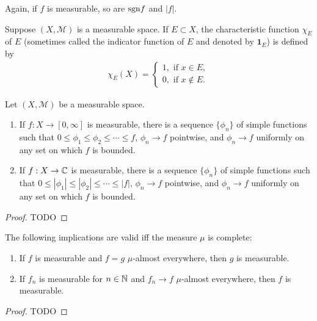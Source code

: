 Again, if $f$ is measurable, so are $\mathrm{sgn} f$ and $|f|$.

\begin{definition}
    Suppose $(X, \mathcal{M})$ is a measurable space.
    If $E \subset X$, the characteristic function $\chi_E$ of $E$ (sometimes called the indicator function of $E$ and denoted by $\mathbf{1}_E$) is defined by
    \begin{align}
        \chi_E(X) = \begin{cases}
            1, \text{ if } x \in E, \\
            0, \text{ if } x \notin E.
        \end{cases}
    \end{align}
\end{definition}

\begin{theorem}
    Let $(X, \mathcal{M})$ be a measurable space.
    \begin{enumerate}
        \item If $f: X \to [0, \infty]$ is measurable, there is a sequence $\{ \phi_n \}$ of simple functions such that $0 \le \phi_1 \le \phi_2 \le \cdots \le f$, $\phi_n \to f$ pointwise, and $\phi_n \to f$ uniformly on any set on which $f$ is bounded.
        \item If $f: X \to \mathbb{C}$ is measurable, there is a sequence $\{ \phi_n \}$ of simple functions such that $0 \le |\phi_1| \le |\phi_2| \le \cdots \le |f|$, $\phi_n \to f$ pointwise, and $\phi_n \to f$ uniformly on any set on which $f$ is bounded.
    \end{enumerate}
\end{theorem}

\begin{proof}
    TODO
\end{proof}

\begin{proposition}
    The following implications are valid iff the measure $\mu$ is complete:
    \begin{enumerate}
        \item If $f$ is measurable and $f = g$ $\mu$-almost everywhere, then $g$ is measurable.
        \item If $f_n$ is measurable for $n \in \mathbb{N}$ and $f_n \to f$ $\mu$-almost everywhere, then $f$ is measurable.
    \end{enumerate}
\end{proposition}

\begin{proof}
    TODO
\end{proof}

